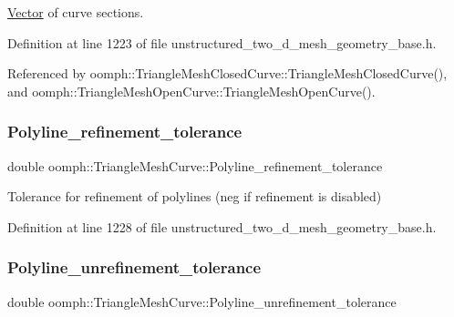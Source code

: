 \hyperlink{classoomph_1_1Vector}{Vector} of curve sections. 



Definition at line 1223 of file unstructured\+\_\+two\+\_\+d\+\_\+mesh\+\_\+geometry\+\_\+base.\+h.



Referenced by oomph\+::\+Triangle\+Mesh\+Closed\+Curve\+::\+Triangle\+Mesh\+Closed\+Curve(), and oomph\+::\+Triangle\+Mesh\+Open\+Curve\+::\+Triangle\+Mesh\+Open\+Curve().

\mbox{\label{classoomph_1_1TriangleMeshCurve_acc89a4f3f6d43568335131c8db0f1738}} 
\subsubsection{\texorpdfstring{Polyline\+\_\+refinement\+\_\+tolerance}{Polyline\_refinement\_tolerance}}
{\footnotesize\ttfamily double oomph\+::\+Triangle\+Mesh\+Curve\+::\+Polyline\+\_\+refinement\+\_\+tolerance\hspace{0.3cm}{\ttfamily [private]}}



Tolerance for refinement of polylines (neg if refinement is disabled) 



Definition at line 1228 of file unstructured\+\_\+two\+\_\+d\+\_\+mesh\+\_\+geometry\+\_\+base.\+h.

\mbox{\label{classoomph_1_1TriangleMeshCurve_a0b44a7d207bff00f30e0f83b84816bae}} 
\subsubsection{\texorpdfstring{Polyline\+\_\+unrefinement\+\_\+tolerance}{Polyline\_unrefinement\_tolerance}}
{\footnotesize\ttfamily double oomph\+::\+Triangle\+Mesh\+Curve\+::\+Polyline\+\_\+unrefinement\+\_\+tolerance\hspace{0.3cm}{\ttfamily [private]}}



